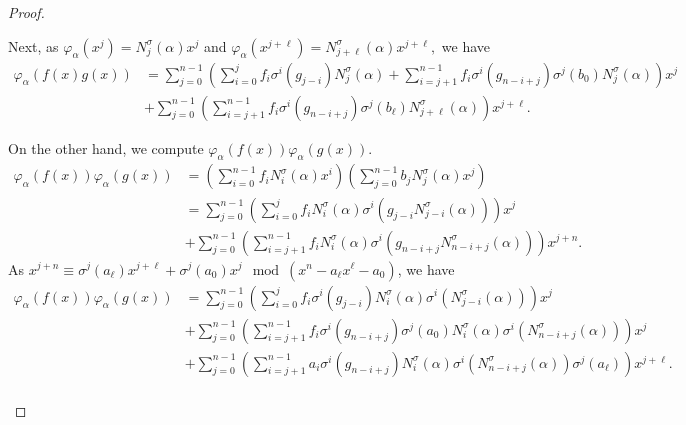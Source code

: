 \documentclass[12pt,paper]{article}
\theoremstyle{plain}
\def\dsum #1#2{\displaystyle{\sum_{#1}^{#2}}}
\begin{document}
\begin{proof}
\begin{itemize}
Next, as $\varphi_\alpha(x^j) = N_j^\sigma(\alpha)x^j$ and $\varphi_\alpha(x^{j+\ell}) = N_{j+\ell}^\sigma(\alpha)x^{j+\ell},$ we have  
\begin{equation}\label{eq11}
\begin{array}{rl}
\varphi_\alpha(f(x)g(x)) &= \dsum{j=0}{n-1} \left( \dsum{i=0}{j} f_i \sigma^i(g_{j-i})  N_j^\sigma(\alpha) +
 \dsum{i=j+1}{n-1} f_i \sigma^i(g_{n-i+j}) \sigma^j(b_0)  N_j^\sigma(\alpha) \right)x^j \\

&+\dsum{j=0}{n-1} \left( \dsum{i=j+1}{n-1} f_i \sigma^i(g_{n-i+j}) \sigma^j(b_\ell) N_{j+\ell}^\sigma(\alpha) \right) x^{j+\ell}.
\end{array}
\end{equation}

On the other hand, we   compute $\varphi_\alpha(f(x))\varphi_\alpha(g(x)).$
$$
\begin{array}{rl}
 \varphi_\alpha(f(x))\varphi_\alpha(g(x))    &=  \left( \dsum{i=0}{n-1} f_i N_i^\sigma(\alpha)x^i \right) \left( \dsum{j=0}{n-1} b_j N_j^\sigma(\alpha)x^j \right) \\
    & = \dsum{j=0}{n-1} \left( \dsum{i=0}{j} f_i N_i^\sigma(\alpha) \sigma^i(g_{j-i}N_{j-i}^\sigma(\alpha)) \right) x^j \\
    &  +\dsum{j=0}{n-1} \left( \dsum{i=j+1}{n-1} f_i N_i^\sigma(\alpha) \sigma^i(g_{n-i+j}N_{n-i+j}^\sigma(\alpha)) \right)x^{j+n}.
\end{array}
$$
As $x^{j+n} \equiv \sigma^j(a_\ell)x^{j+\ell} + \sigma^j(a_0)x^j \mod (x^n - a_\ell x^\ell - a_0)$,  we have 
\begin{equation}\label{eq12}
\begin{array}{rl}
\varphi_\alpha(f(x))\varphi_\alpha(g(x)) &= \dsum{j=0}{n-1} \left( \dsum{i=0}{j} f_i\sigma^i(g_{j-i})  N_i^\sigma(\alpha) \sigma^i(N_{j-i}^\sigma(\alpha))\right)x^j \\
&+ \dsum{j=0}{n-1} \left( \dsum{i=j+1}{n-1} f_i  \sigma^i(g_{n-i+j})  \sigma^j(a_0) N_i^\sigma(\alpha)\sigma^i(N_{n-i+j}^\sigma(\alpha))  \right)x^j 
\\
& +\dsum{j=0}{n-1} \left( \dsum{i=j+1}{n-1} a_i  \sigma^i(g_{n-i+j}) N_i^\sigma(\alpha) \sigma^i(N_{n-i+j}^\sigma(\alpha))\sigma^j(a_\ell) \right)x^{j+\ell}.\\
\end{array}
\end{equation}


\end{itemize}
\end{proof}
\end{document}
